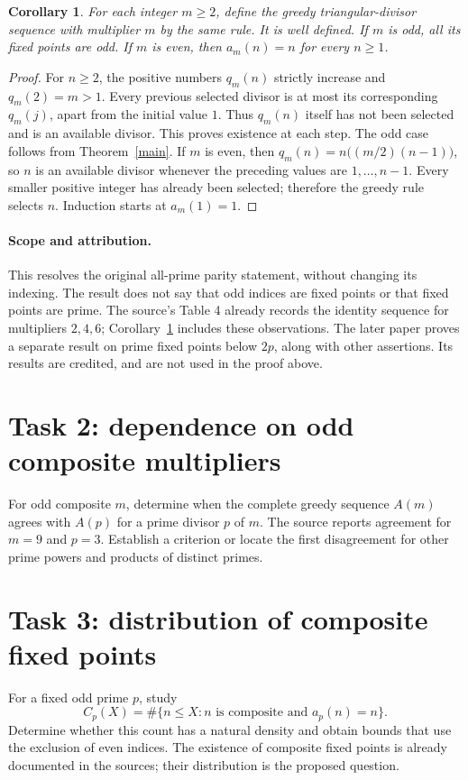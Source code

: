 \documentclass[11pt]{article}
\newtheorem{corollary}{Corollary}
\begin{document}
\begin{corollary}\label{dichotomy}
For each integer $m\geq2$, define the greedy triangular-divisor
sequence with multiplier $m$ by the same rule. It is well defined.
If $m$ is odd, all its fixed points are odd. If $m$ is even,
then $a_m(n)=n$ for every $n\geq1$.
\end{corollary}
\begin{proof}
For $n\geq2$, the positive numbers $q_m(n)$ strictly increase
and $q_m(2)=m>1$. Every previous selected divisor is at most
its corresponding $q_m(j)$, apart from the initial value $1$.
Thus $q_m(n)$ itself has not been selected and is an available
divisor. This proves existence at each step. The odd case follows
from Theorem~\ref{main}. If $m$ is even, then
$q_m(n)=n\bigl((m/2)(n-1)\bigr)$, so $n$ is an available divisor
whenever the preceding values are $1,\ldots,n-1$.
Every smaller positive integer has already been selected;
therefore the greedy rule selects $n$. Induction starts at $a_m(1)=1$.
\end{proof}

\paragraph{Scope and attribution.}
This resolves the original all-prime parity statement, without
changing its indexing. The result does not say that odd indices
are fixed points or that fixed points are prime. The source's
Table 4 already records the identity sequence for multipliers
$2,4,6$; Corollary~\ref{dichotomy} includes these observations.
The later paper \cite{AA} proves a separate result on prime fixed
points below $2p$, along with other assertions. Its results are
credited, and are not used in the proof above.

\section*{Task 2: dependence on odd composite multipliers}
For odd composite $m$, determine when the complete greedy sequence
$A(m)$ agrees with $A(p)$ for a prime divisor $p$ of $m$.
The source reports agreement for $m=9$ and $p=3$.
Establish a criterion or locate the first disagreement for other
prime powers and products of distinct primes.

\section*{Task 3: distribution of composite fixed points}
For a fixed odd prime $p$, study
\[
 C_p(X)=\#\{n\leq X:n\text{ is composite and }a_p(n)=n\}.
\]
Determine whether this count has a natural density and obtain
bounds that use the exclusion of even indices. The existence of
composite fixed points is already documented in the sources;
their distribution is the proposed question.
\end{document}
